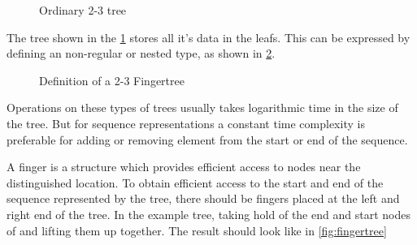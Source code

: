 \begin{figure}[!h]
\centering
{}
\caption{Ordinary 2-3 tree
\label{fig:2-3tree}}
\end{figure}

The tree shown in the \cref{fig:2-3tree} stores all it's data in the leafs.
This can be expressed by defining an non-regular or nested type, as shown in
\cref{fig:2-3Fingertree}.

\begin{figure}[h!]

\caption{Definition of a 2-3 Fingertree \label{fig:2-3Fingertree}}
\end{figure}

Operations on these types of trees usually takes logarithmic time in the size of
the tree. But for sequence representations a constant time complexity is
preferable for adding or removing element from the start or end of the sequence.

A finger is a structure which provides efficient access to nodes near the
distinguished location. To obtain efficient access to the start and end of the
sequence represented by the tree, there should be fingers placed at the left and
right end of the tree. In the example tree, taking hold of the end and start
nodes of and lifting them up together. The result should look like in
\cref{fig:fingertree}

